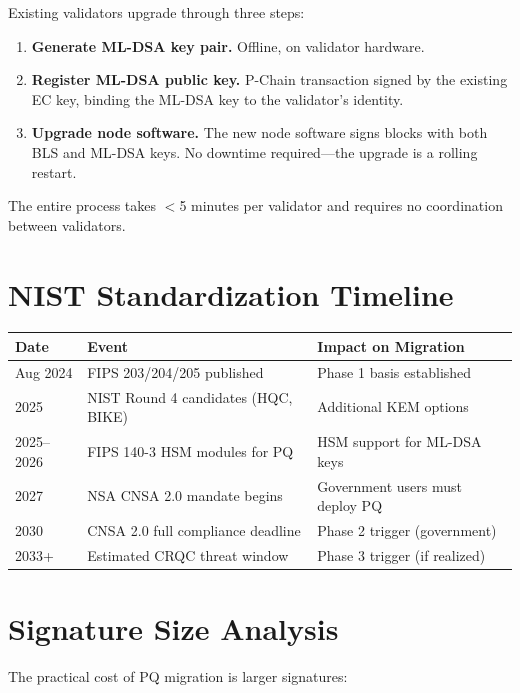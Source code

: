\documentclass[11pt,a4paper]{article}
\begin{document}
Existing validators upgrade through three steps:

\begin{enumerate}[leftmargin=2em]
\item \textbf{Generate ML-DSA key pair.} Offline, on validator hardware.
\item \textbf{Register ML-DSA public key.} P-Chain transaction signed by the existing EC key, binding the ML-DSA key to the validator's identity.
\item \textbf{Upgrade node software.} The new node software signs blocks with both BLS and ML-DSA keys. No downtime required---the upgrade is a rolling restart.
\end{enumerate}

The entire process takes $<$5 minutes per validator and requires no coordination between validators.

\section{NIST Standardization Timeline}

\begin{center}
\begin{tabular}{lll}
\toprule
\textbf{Date} & \textbf{Event} & \textbf{Impact on Migration} \\
\midrule
Aug 2024 & FIPS 203/204/205 published & Phase 1 basis established \\
2025 & NIST Round 4 candidates (HQC, BIKE) & Additional KEM options \\
2025--2026 & FIPS 140-3 HSM modules for PQ & HSM support for ML-DSA keys \\
2027 & NSA CNSA 2.0 mandate begins & Government users must deploy PQ \\
2030 & CNSA 2.0 full compliance deadline & Phase 2 trigger (government) \\
2033+ & Estimated CRQC threat window & Phase 3 trigger (if realized) \\
\bottomrule
\end{tabular}
\end{center}

\section{Signature Size Analysis}

The practical cost of PQ migration is larger signatures:
\end{document}
